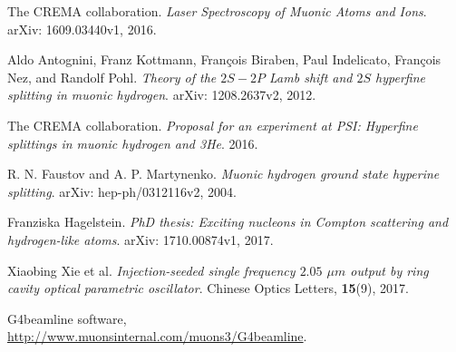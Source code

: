 \documentclass[12pt]{article}
\begin{document}
\begin{thebibliography}{9}
The CREMA collaboration. \textit{Laser Spectroscopy of Muonic Atoms and Ions}. arXiv: 1609.03440v1, 2016.

Aldo Antognini, Franz Kottmann, Fran\c{c}ois Biraben, Paul Indelicato, Fran\c{c}ois Nez, and Randolf Pohl. \textit{Theory of the $2S-2P$ Lamb shift and $2S$ hyperfine splitting in muonic hydrogen}. arXiv: 1208.2637v2, 2012.

The CREMA collaboration. \textit{Proposal for an experiment at PSI: Hyperfine splittings in muonic hydrogen and 3He}. 2016.

R. N. Faustov and A. P. Martynenko. \textit{Muonic hydrogen ground state hyperine splitting}. arXiv: hep-ph/0312116v2, 2004.

Franziska Hagelstein. \textit{PhD thesis: Exciting nucleons in Compton scattering and hydrogen-like atoms}. arXiv: 1710.00874v1, 2017.

Xiaobing Xie et al. \textit{Injection-seeded single frequency $2.05$ ${\mu}m$ output by ring cavity optical parametric oscillator}. Chinese Optics Letters, \textbf{15}(9), 2017.

G4beamline software,\\
\url{http://www.muonsinternal.com/muons3/G4beamline}.



 
 
\end{thebibliography}
\end{document}
